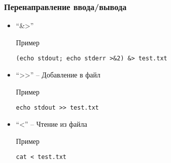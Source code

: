 \begin{frame}[fragile]
	\frametitle{Перенаправление ввода/вывода}

	\begin{itemize}

		\item ``\&>''
			\begin{block}{Пример}
				\begin{lstlisting}
(echo stdout; echo stderr >&2) &> test.txt
\end{lstlisting}
			\end{block}
		
		\item ``>{}>'' -- Добавление в файл
			\begin{block}{Пример}
				\begin{lstlisting}
echo stdout >> test.txt
\end{lstlisting}
			\end{block}

		\item ``<'' -- Чтение из файла
			\begin{block}{Пример}
				\begin{lstlisting}
cat < test.txt
\end{lstlisting}
			\end{block}
	\end{itemize}

\end{frame}
